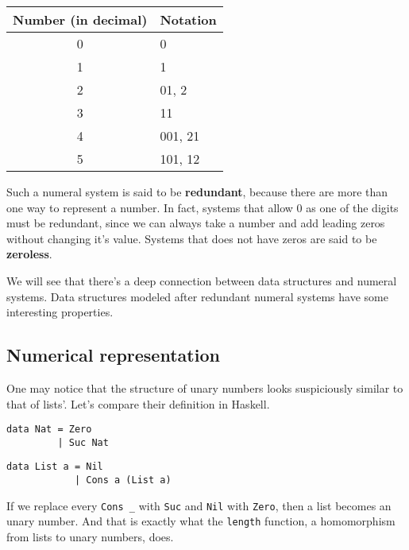 \documentclass[../thesis.tex]{subfiles}
\begin{document}
\begin{center}
    \begin{tabular}{c*{1}{l}}
    Number (in decimal)  & Notation \\
    \hline
    0       & 0 \\
    1       & 1 \\
    2       & 01, 2 \\
    3       & 11 \\
    4       & 001, 21 \\
    5       & 101, 12 \\
    \end{tabular}
\end{center}

Such a numeral system is said to be \textbf{redundant}, because there are more than one
way to represent a number. In fact, systems that allow $ 0 $ as one of the digits
must be redundant, since we can always take a number and add leading zeros without
changing it's value. Systems that does not have zeros are said to be \textbf{zeroless}.

We will see that there's a deep connection between data
structures and  numeral systems. Data structures modeled after redundant numeral
systems have some interesting properties.

\subsection{Numerical representation}

One may notice that the structure of unary numbers looks suspiciously similar
to that of lists'. Let's compare their definition in Haskell.

\noindent\begin{minipage}{.45\textwidth}
\begin{lstlisting}
data Nat = Zero
         | Suc Nat
\end{lstlisting}
\end{minipage}\hfill
\begin{minipage}{.48\textwidth}
\begin{lstlisting}
data List a = Nil
            | Cons a (List a)
\end{lstlisting}
\end{minipage}

If we replace every {\lstinline|Cons _|} with {\lstinline|Suc|} and {\lstinline|Nil|}
with {\lstinline|Zero|}, then a list becomes an unary number.
And that is exactly what the {\lstinline|length|} function,
a homomorphism from lists to unary numbers, does.
\end{document}
